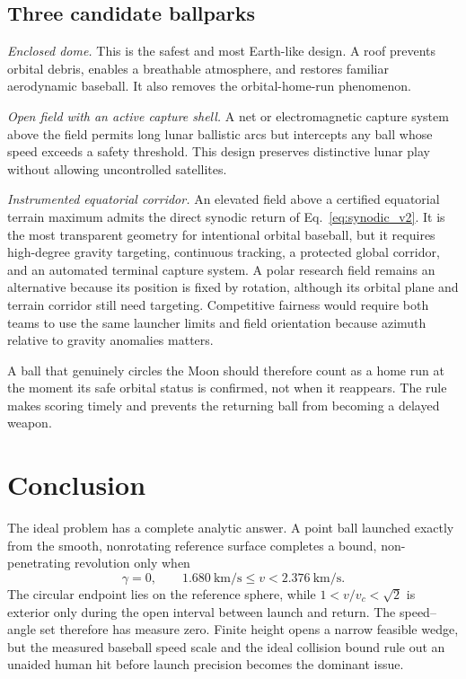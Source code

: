 \subsection{Three candidate ballparks}

\emph{Enclosed dome.} This is the safest and most Earth-like design. A roof prevents orbital debris, enables a breathable atmosphere, and restores familiar aerodynamic baseball. It also removes the orbital-home-run phenomenon.

\emph{Open field with an active capture shell.} A net or electromagnetic capture system above the field permits long lunar ballistic arcs but intercepts any ball whose speed exceeds a safety threshold. This design preserves distinctive lunar play without allowing uncontrolled satellites.

\emph{Instrumented equatorial corridor.} An elevated field above a certified equatorial terrain maximum admits the direct synodic return of Eq.~\eqref{eq:synodic_v2}. It is the most transparent geometry for intentional orbital baseball, but it requires high-degree gravity targeting, continuous tracking, a protected global corridor, and an automated terminal capture system. A polar research field remains an alternative because its position is fixed by rotation, although its orbital plane and terrain corridor still need targeting. Competitive fairness would require both teams to use the same launcher limits and field orientation because azimuth relative to gravity anomalies matters.

A ball that genuinely circles the Moon should therefore count as a home run at the moment its safe orbital status is confirmed, not when it reappears. The rule makes scoring timely and prevents the returning ball from becoming a delayed weapon.

\section{Conclusion}

The ideal problem has a complete analytic answer. A point ball launched exactly from the smooth, nonrotating reference surface completes a bound, non-penetrating revolution only when
\begin{equation*}
 \gamma=0,\qquad
 \SI{1.680}{\kilo\metre\per\second}\leq v<\SI{2.376}{\kilo\metre\per\second}.
\end{equation*}
The circular endpoint lies on the reference sphere, while \(1<v/v_c<\sqrt2\) is exterior only during the open interval between launch and return. The speed–angle set therefore has measure zero. Finite height opens a narrow feasible wedge, but the measured baseball speed scale and the ideal collision bound rule out an unaided human hit before launch precision becomes the dominant issue.

